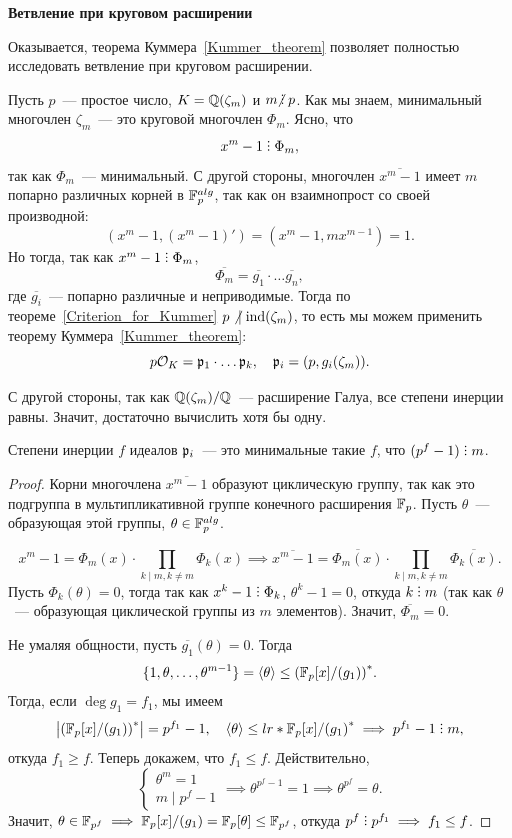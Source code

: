  	\noindent\bf{Ветвление при круговом расширении}

 	Оказывается, теорема Куммера~\ref{Kummer_theorem} позволяет полностью исследовать ветвление при круговом расширении. 

 	Пусть $p$~--- простое число, $K = \mathbb{Q}(\zeta_m)$ и $m \notdivby p$. Как мы знаем, минимальный многочлен $\zeta_m$~--- это круговой многочлен $\Phi_m$. Ясно, что 
 	\[
 		x^m - 1 \divby \Phi_m,
 	\]
 	так как $\Phi_m$~--- минимальный. С другой стороны, многочлен $\overline{x^m - 1}$ имеет $m$ попарно различных корней в $\mathbb{F}_{p}^{alg}$, так как он взаимнопрост со своей производной:
 	\[
 		(x^m - 1, (x^m - 1)') = (x^m - 1, m x^{m - 1}) = 1.
 	\]
 	Но тогда, так как $x^m - 1 \divby \Phi_m$,
 	\[
 		\overline{\Phi_m} = \overline{g_1} \cdot \ldots \overline{g_n},
 	\]
 	где $\overline{g_i}$~--- попарно различные и неприводимые. Тогда по теореме~\ref{Criterion_for_Kummer} $p \not \ \mid \operatorname{ind}(\zeta_m)$, то есть мы можем применить теорему Куммера~\ref{Kummer_theorem}:
 	\[
 	 	p\mathcal{O}_{K} = \mathfrak{p}_{1} \cdot \ldots \mathfrak{p}_{k}, \quad \mathfrak{p}_{i} = (p, g_i(\zeta_m)). 
 	 \] 

 	 С другой стороны, так как $\mathbb{Q}(\zeta_m)/\mathbb{Q}$~--- расширение Галуа, все степени инерции равны. Значит, достаточно вычислить хотя бы одну. 

 	 \begin{statement} 
 	 	Степени инерции $f$ идеалов $\mathfrak{p}_i$~--- это минимальные такие $f$, что $(p^{f} - 1) \divby m$. 
 	 \end{statement}
 	 \begin{proof}
 	 	Корни многочлена $\overline{x^m - 1}$  образуют циклическую группу, так как это подгруппа в мультипликативной группе конечного расширения $\mathbb{F}_{p}$. Пусть $\theta$~--- образующая этой группы, $\theta \in \mathbb{F}_{p}^{alg}$. 

 	 	\[
 	 		x^m - 1 = \Phi_m(x) \cdot \prod_{k \mid m, k \neq m} \Phi_k(x) \implies \overline{x^m - 1} = \overline{\Phi_m(x)} \cdot \prod_{k \mid m, k \neq m} \overline{\Phi_k(x)}. 
 	 	\]
 	 	Пусть $\Phi_k(\theta) = 0$, тогда так как $x^k - 1 \divby \Phi_k$, $\theta^k - 1 = 0$, откуда $k \divby m$ (так как $\theta$~--- образующая циклической группы из $m$ элементов). Значит, $\overline{\Phi_m} = 0$. 

 	 	Не умаляя общности, пусть $\overline{g_{1}}(\theta) = 0$. Тогда 
 	 	\[
 	 		\{ 1, \theta, \ldots, \theta^{m - 1} \} = \langle \theta \rangle \le \lr*{\F_{p}[x]/(g_1)}^{*}.
 	 	\]
 	 	Тогда, если $\deg{g_1} = f_1$, мы имеем 
 	 	\[
 	 		\left\lvert \lr*{\F_{p}[x]/(g_1)}^{*} \right\rvert = p^{f_1} - 1, \quad \langle \theta \rangle \le lr*{\F_{p}[x]/(g_1)}^{*} \implies p^{f_1} - 1 \divby m,
 	 	\]
 	 	откуда $f_1 \ge f$.  Теперь докажем, что $f_1 \le f$. Действительно, 
 	 	\[
 	 		\begin{cases} \theta^m = 1 \\ m \mid p^{f} - 1 \end{cases} \implies \theta^{p^{f} - 1} = 1 \implies \theta^{p^f} = \theta.
 	 	\]
 	 	Значит, $\theta \in \mathbb{F}_{p^{f}} \implies \mathbb{F}_{p}[x]/(g_1) = \mathbb{F}_{p}[\theta] \le \mathbb{F}_{p^{f}}$, откуда $p^{f} \divby p^{f_1} \implies f_1 \le f$.    
 	 \end{proof}

